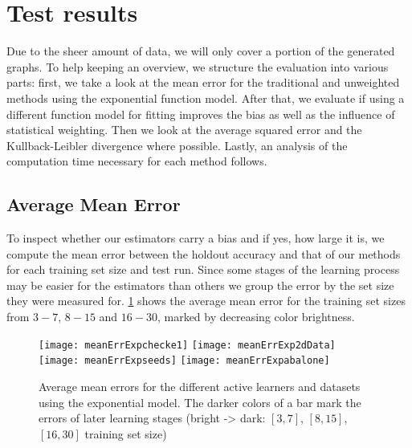 \section{Test results}

Due to the sheer amount of data, we will only cover a portion of the generated graphs. To help keeping an overview, we structure the evaluation into various parts: first, we take a look at the mean error for the traditional and unweighted methods using the exponential function model. After that, we evaluate if using a different function model for fitting improves the bias as well as the influence of statistical weighting. Then we look at the average squared error and the Kullback-Leibler divergence where possible. Lastly, an analysis of the computation time necessary for each method follows.

\subsection{Average Mean Error}

To inspect whether our estimators carry a bias and if yes, how large it is, we compute the mean error between the holdout accuracy and that of our methods for each training set size and test run. Since some stages of the learning process may be easier for the estimators than others we group the error by the set size they were measured for. \ref{fig:meanErrorsExp} shows the average mean error for the training set sizes from $3-7$, $8-15$ and $16-30$, marked by decreasing color brightness.

\begin{figure}[h]
	\centering
	\texttt{[image: meanErrExpchecke1]}
	\texttt{[image: meanErrExp2dData]}
	\texttt{[image: meanErrExpseeds]}
	\texttt{[image: meanErrExpabalone]}
	\caption{Average mean errors for the different active learners and datasets using the exponential model. The darker colors of a bar mark the errors of later learning stages (bright -> dark: $[3,7]$, $[8,15]$, $[16,30]$ training set size)}
	\label{fig:meanErrorsExp}
\end{figure}

